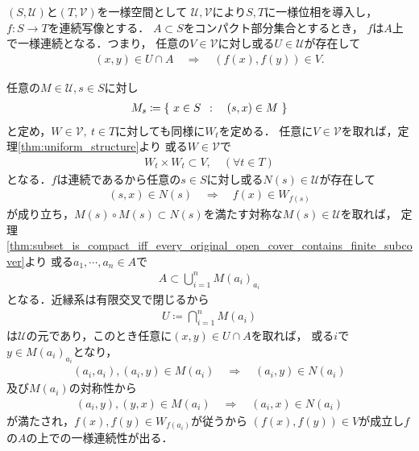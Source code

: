 	\begin{screen}
		\begin{thm}[一様連続なら連続]
		\end{thm}
	\end{screen}
	
	\begin{screen}
		\begin{thm}[コンパクト集合上で連続写像は一様連続]
			$(S,\mathscr{U})$と$(T,\mathscr{V})$を一様空間として
			$\mathscr{U},\mathscr{V}$により$S,T$に一様位相を導入し，
			$f:S \longrightarrow T$を連続写像とする．
			$A \subset S$をコンパクト部分集合とするとき，
			$f$は$A$上で一様連続となる．つまり，
			任意の$V \in \mathscr{V}$に対し或る$U \in \mathscr{U}$が存在して
			\begin{align}
				(x,y) \in U \cap A \quad \Longrightarrow \quad (f(x),f(y)) \in V.
			\end{align}
		\end{thm}
	\end{screen}
	
	\begin{prf}
		任意の$M \in \mathscr{U}, s \in S$に対し
		\begin{align}
			M_s \coloneqq \left\{\ x \in S\ \, : \quad (s,x) \in M\ \right\}
		\end{align}
		と定め，$W \in \mathscr{V},\ t \in T$に対しても同様に$W_t$を定める．
		任意に$V \in \mathscr{V}$を取れば，定理\ref{thm:uniform_structure}より
		或る$W \in \mathscr{V}$で
		\begin{align}
			W_t \times W_t \subset V,
			\quad (\forall t \in T)
		\end{align}
		となる．$f$は連続であるから任意の$s \in S$に対し或る$N(s) \in \mathscr{U}$が存在して
		\begin{align}
			(s,x) \in N(s) \quad \Longrightarrow \quad
			f(x) \in W_{f(s)}
		\end{align}
		が成り立ち，$M(s) \circ M(s) \subset N(s)$を満たす対称な$M(s) \in \mathscr{U}$を取れば，
		定理\ref{thm:subset_is_compact_iff_every_original_open_cover_contains_finite_subcover}より
		或る$a_1,\cdots,a_n \in A$で
		\begin{align}
			A \subset \bigcup_{i=1}^n M(a_i)_{a_i}
		\end{align}
		となる．近縁系は有限交叉で閉じるから
		\begin{align}
			U \coloneqq \bigcap_{i=1}^n M(a_i)
		\end{align}
		は$\mathscr{U}$の元であり，このとき任意に$(x,y) \in U \cap A$を取れば，
		或る$i$で$y \in M(a_i)_{a_i}$となり，
		\begin{align}
			(a_i,a_i),(a_i,y) \in M(a_i) \quad \Longrightarrow \quad
			(a_i,y) \in N(a_i)
		\end{align}
		及び$M(a_i)$の対称性から
		\begin{align}
			(a_i,y),(y,x) \in M(a_i) \quad \Longrightarrow \quad
			(a_i,x) \in N(a_i)
		\end{align}
		が満たされ，$f(x),f(y) \in W_{f(a_i)}$が従うから
		$(f(x),f(y)) \in V$が成立し$f$の$A$の上での一様連続性が出る．
		\QED
	\end{prf}
	
